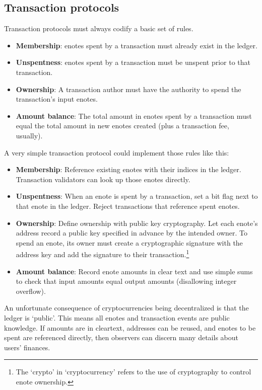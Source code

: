 \subsection{Transaction protocols}
\label{subsec:intro-transaction protocols}

Transaction protocols must always codify a basic set of rules.

\begin{itemize}
    \item \textbf{Membership}: enotes spent by a transaction must already exist in the ledger.
    \item \textbf{Unspentness}: enotes spent by a transaction must be unspent prior to that transaction.
    \item \textbf{Ownership}: A transaction author must have the authority to spend the transaction's input enotes.
    \item \textbf{Amount balance}: The total amount in enotes spent by a transaction must equal the total amount in new enotes created (plus a transaction fee, usually).
\end{itemize}

A very simple transaction protocol could implement those rules like this:

\begin{itemize}
    \item \textbf{Membership}: Reference existing enotes with their indices in the ledger. Transaction validators can look up those enotes directly.
    \item \textbf{Unspentness}: When an enote is spent by a transaction, set a bit flag next to that enote in the ledger. Reject transactions that reference spent enotes.
    \item \textbf{Ownership}: Define ownership with public key cryptography. Let each enote's address record a public key specified in advance by the intended owner. To spend an enote, its owner must create a cryptographic signature with the address key and add the signature to their transaction.\footnote{The `crypto' in `cryptocurrency' refers to the use of cryptography to control enote ownership.}
    \item \textbf{Amount balance}: Record enote amounts in clear text and use simple sums to check that input amounts equal output amounts (disallowing integer overflow).
\end{itemize}

An unfortunate consequence of cryptocurrencies being decentralized is that the ledger is `public'. This means all enotes and transaction events are public knowledge. If amounts are in cleartext, addresses can be reused, and enotes to be spent are referenced directly, then observers can discern many details about users' finances.


